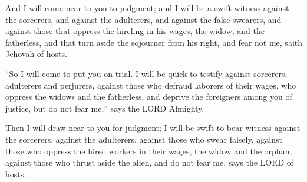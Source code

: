 			\begin{versebox}
					\item[BHS] 
					\item[LXX] 
					\item[ASV] And I will come near to you to judgment; and I will be a swift witness against the sorcerers, and against the adulterers, and against the false swearers, and against those that oppress the hireling in his wages, the widow, and the fatherless, and that turn aside the sojourner from his right, and fear not me, saith Jehovah of hosts.
					\item[NIV] “So I will come to put you on trial. I will be quick to testify against sorcerers, adulterers and perjurers, against those who defraud laborers of their wages, who oppress the widows and the fatherless, and deprive the foreigners among you of justice, but do not fear me,” says the LORD Almighty.
					\item[NRSV] Then I will draw near to you for judgment; I will be swift to bear witness against the sorcerers, against the adulterers, against those who swear falsely, against those who oppress the hired workers in their wages, the widow and the orphan, against those who thrust aside the alien, and do not fear me, says the LORD of hosts.
			\end{versebox}

